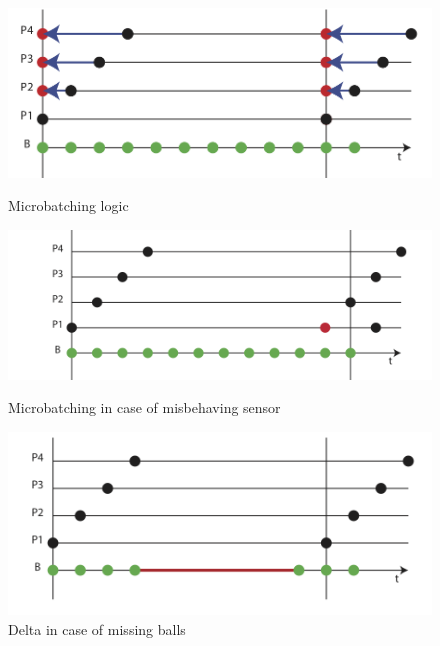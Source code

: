 \documentclass[a4paper]{article}
\begin{document}
\begin{figure}[!htb]
  \includegraphics[width=\linewidth]{microbatches1.png}
  \caption{Microbatching logic}\label{fig:microbatch1}
\endminipage\hfill
{}
  \includegraphics[width=\linewidth]{microbatches2.png}
  \caption{ Microbatching in case of misbehaving sensor}\label{fig:microbatch2}
\endminipage\hfill
{}%
  \includegraphics[width=\linewidth]{microbatches.png}
  \caption{Delta in case of missing balls}\label{fig:microbatch3}
\endminipage
\end{figure}
\end{document}
